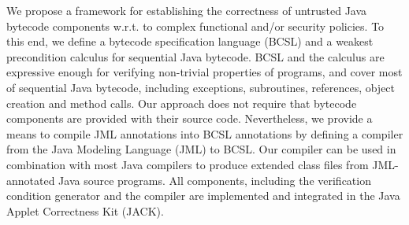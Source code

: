 
We propose a framework for establishing the correctness of untrusted
Java bytecode components w.r.t. to complex functional and/or security
policies. To this end, we define a bytecode specification language
(BCSL) and a weakest precondition calculus for sequential Java
bytecode. BCSL and the calculus are expressive enough for verifying
non-trivial properties of programs, and cover most of sequential Java
bytecode, including exceptions, subroutines, references, object
creation and method calls. Our approach does not require that bytecode components are provided
with their source code. Nevertheless, we provide a means to
compile JML annotations into BCSL annotations 
by defining a compiler from the Java Modeling Language (JML) to BCSL.
Our compiler can be used in combination with most Java compilers to
produce extended class files from JML-annotated Java source programs. All components, including the verification condition generator and the
compiler are implemented and integrated in the Java Applet Correctness
Kit (JACK).
